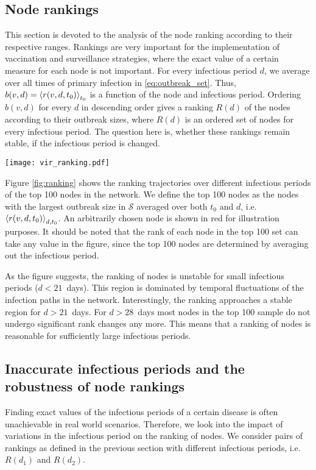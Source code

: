 \subsection{Node rankings}
This section is devoted to the analysis of the node ranking according to their respective ranges.
Rankings are very important for the implementation of vaccination and surveillance strategies, where the exact value of a certain measure for each node is not important.
For every infectious period $d$, we average over all times of primary infection in \eqref{eq:outbreak_set}.
Thus, $b(v,d)=\left< r(v,d,t_0) \right>_{t_0}$ is a function of the node and infectious period.
Ordering $b(v,d)$ for every $d$ in descending order gives a ranking $R(d)$ of the nodes according to their outbreak sizes, where $R(d)$ is an ordered set of nodes for every infectious period.
The question here is, whether these rankings remain stable, if the infectious period is changed.
%
\begin{SCfigure}
\texttt{[image: vir\_ranking.pdf]}
\caption{Node ranking of the top 100 nodes over different infectious periods.
Rankings are computed by averaging \eqref{eq:outbreak_set} over the time of primary infection.
Top 100 nodes are the nodes with the largest outbreak sizes averaged over $d$ and $t_0$.
The rankings of an arbitrary node are shown in red for illustration purposes.}
\label{fig:ranking}
\end{SCfigure}

Figure \ref{fig:ranking} shows the ranking trajectories over different infectious periods of the top 100 nodes in the network. 
We define the top 100 nodes as the nodes with the largest outbreak size in $\mathcal{S}$ averaged over both $t_0$ and $d$, i.e. $\left< r(v,d,t_0) \right>_{d,t_0}$.
An arbitrarily chosen node is shown in red for illustration purposes.
It should be noted that the rank of each node in the top 100 set can take any value in the figure, since the top 100 nodes are determined by averaging out the infectious period.

As the figure suggests, the ranking of nodes is unstable for small infectious periods ($d<21$~days).
This region is dominated by temporal fluctuations of the infection paths in the network.
Interestingly, the ranking approaches a stable region for $d>21$~days.
For $d>28$~days most nodes in the top 100 sample do not undergo significant rank changes any more.
This means that a ranking of nodes is reasonable for sufficiently large infectious periods.

\subsection{Inaccurate infectious periods and the robustness of node rankings}
Finding exact values of the infectious periods of a certain disease is often unachievable in real world scenarios.
Therefore, we look into the impact of variations in the infectious period on the ranking of nodes.
We consider pairs of rankings as defined in the previous section with different infectious periods, i.e. $R(d_1)$ and $R(d_2)$.

